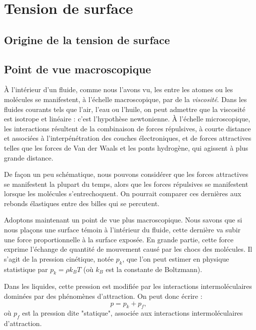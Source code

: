 \chapter{Tension de surface}

\section{Origine de la tension de surface}

\section{Point de vue macroscopique}

À l'intérieur d'un fluide, comme nous l'avons vu, les  entre les atomes ou les molécules se manifestent, à l'échelle macroscopique, par de la \emph{viscosité}. Dans les fluides courants tels que l'air, l'eau ou l'huile, on peut admettre que la viscosité est isotrope et linéaire : c'est l'hypothèse newtonienne. À l'échelle microscopique, les interactions résultent de la combinaison de forces répulsives, à courte distance et associées à l'interpénétration des couches électroniques, et de forces attractives telles que les forces de Van der Waals et les ponts hydrogène, qui agissent à plus grande distance.

De façon un peu schématique, nous pouvons considérer que les forces attractives se manifestent la plupart du temps, alors que les forces répulsives se manifestent lorsque les molécules s'entrechoquent. On pourrait comparer ces dernières aux rebonds élastiques entre des billes qui se percutent.

Adoptons maintenant un point de vue plus macroscopique. Nous savons que si nous plaçons une surface témoin à l'intérieur du fluide, cette dernière va subir une force proportionnelle à la surface exposée. En grande partie, cette force exprime l'échange de quantité de mouvement causé par les chocs des molécules. Il s'agit de la pression cinétique, notée $p_k$, que l'on peut estimer en physique statistique par $p_k = \rho k_B T$ (où $k_B$ est la constante de Boltzmann).

Dans les liquides, cette pression est modifiée par les interactions intermoléculaires dominées par des phénomènes d'attraction. On peut donc écrire \cite{berry71aa} :
\begin{equation}
  p = p_k + p_f,
  \label{eq:pression}
\end{equation}
où $p_f$ est la pression dite "statique", associée aux interactions intermoléculaires d'attraction.


